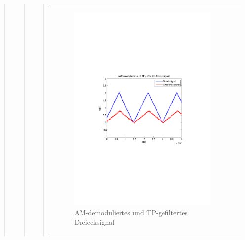 \begin{quote}
\begin{quote}
\begin{quote}
\begin{center}
\begin{tabular}{ll}
\begin{minipage}{0.6\textwidth}
                         \begin{figure}[H]
                            \label{fig:}
                            \includegraphics[scale=0.5, trim = 2cm 6.5cm 1.5cm
                            8.5cm, clip]{./Bilder/synchDemodFilter_dreieck} %
                            \caption{AM-demoduliertes und
                            TP-gefiltertes Dreiecksignal}
                        \end{figure}
                   \vspace{-1.5em}
    
                    \end{minipage}
    
                \end{tabular}
                \end{center}
                

\end{quote}
\end{quote}
\end{quote}

